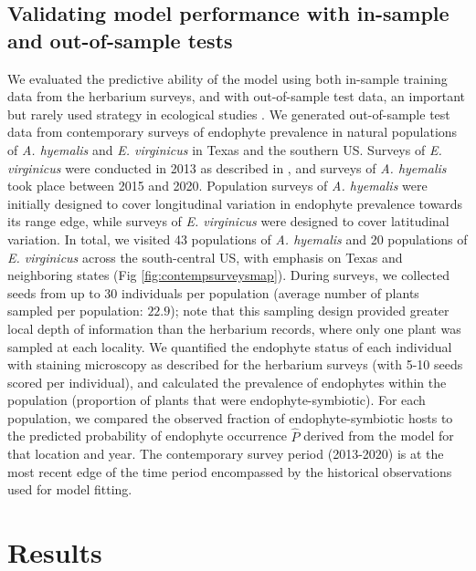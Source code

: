 \documentclass[11pt]{article}
\let\cite\citep
\begin{document}
\subsection*{Validating model performance with in-sample and out-of-sample tests}
We evaluated the predictive ability of the model using both in-sample training data from the herbarium surveys, and with out-of-sample test data, an important but rarely used strategy in ecological studies \cite{tredennick2021practical, lee2024phenological}.
We generated out-of-sample test data from contemporary surveys of endophyte prevalence in natural populations of \emph{A. hyemalis} and \emph{E. virginicus} in Texas and the southern US. 
Surveys of \emph{E. virginicus} were conducted in 2013 as described in \citet{sneck2017variation}, and surveys of \emph{A. hyemalis} took place between 2015 and 2020.
Population surveys of \emph{A. hyemalis} were initially designed to cover longitudinal variation in endophyte prevalence towards its range edge, while surveys of \emph{E. virginicus} were designed to cover latitudinal variation. 
In total, we visited 43 populations of \emph{A. hyemalis} and 20 populations of \emph{E. virginicus} across the south-central US, with emphasis on Texas and neighboring states (Fig \ref{fig:contempsurveysmap}).
During surveys, we collected seeds from up to 30 individuals per population (average number of plants sampled per population: $22.9$); note that this sampling design provided greater local depth of information than the herbarium records, where only one plant was sampled at each locality.
We quantified the endophyte status of each individual with staining microscopy as described for the herbarium surveys (with 5-10 seeds scored per individual), and calculated the prevalence of endophytes within the population (proportion of plants that were endophyte-symbiotic).
For each population, we compared the observed fraction of endophyte-symbiotic hosts to the predicted probability of endophyte occurrence $\hat{P}$ derived from the model for that location and year. 
The contemporary survey period (2013-2020) is at the most recent edge of the time period encompassed by the historical observations used for model fitting.

		
\section*{Results}
\end{document}
